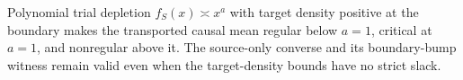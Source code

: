 Polynomial trial depletion \(f_S(x)\asymp x^a\) with target density positive at the boundary makes the transported causal mean regular below \(a=1\), critical at \(a=1\), and nonregular above it. The source-only converse and its boundary-bump witness remain valid even when the target-density bounds have no strict slack.